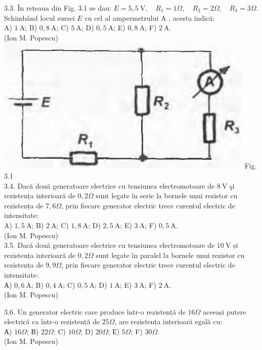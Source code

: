 \documentclass[10pt]{article}
\begin{document}
3.3. În rețeaua din Fig. 3.1 se dau: $E=5,5 \mathrm{~V}, \quad R_{1}=1 \Omega, \quad R_{2}=2 \Omega, \quad R_{3}=3 \Omega$. Schimbând locul sursei $E$ cu cel al ampermetrului A , acesta indică:\\ A) $1 \mathrm{~A}$; B) $0,8 \mathrm{~A}$; C) $5 \mathrm{~A}$; D) $0,5 \mathrm{~A}$; E) $0,8 \mathrm{~A}$; F) $2 \mathrm{~A}$.\\ (Ion M. Popescu)\\ \includegraphics[max width=\textwidth, center]{2025_07_01_5b3ff9fa0d508c8e9f17g-144} Fig. 3.1\\

3.4. Dacă două generatoare electrice cu tensiunea electromotoare de $8 \mathrm{~V}$ şi rezistența interioară de $0,2 \Omega$ sunt legate în serie la bornele unui rezistor cu rezistența de $7,6 \Omega$, prin fiecare generator electric trece curentul electric de intensitate:\\ A) $1,5 \mathrm{~A}$; B) $2 \mathrm{~A}$; C) $1,8 \mathrm{~A}$; D) $2,5 \mathrm{~A}$; E) $3 \mathrm{~A}$; F) $0,5 \mathrm{~A}$.\\ (Ion M. Popescu)\\

3.5. Dacă două generatoare electrice cu tensiunea electromotoare de $10 \mathrm{~V}$ și rezistența interioară de $0,2 \Omega$ sunt legate în paralel la bornele unui rezistor cu rezistența de $9,9 \Omega$, prin fiecare generator electric trece curentul electric de intensitate:\\ А) $0,6 \mathrm{~A}$; B) $0,4 \mathrm{~A}$; C) $0,5 \mathrm{~A}$; D) $1 \mathrm{~A}$; E) $3 \mathrm{~A}$; F) $2 \mathrm{~A}$.\\ (Ion M. Popescu)

3.6. Un generator electric care produce într-o rezistență de $16 \Omega$ aceeași putere electrică ca într-o rezistență de $25 \Omega$, are rezistența interioară egală cu:\\ А) $16 \Omega$; В) $22 \Omega$; C) $10 \Omega$; D) $20 \Omega$; Е) $5 \Omega$; F) $30 \Omega$.\\ (Ion M. Popescu)\\
\end{document}
